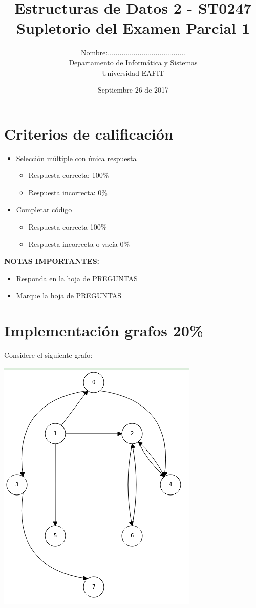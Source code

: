 \documentclass[twocolumn]{article}
\author{
Nombre:....................................... \\
    Departamento de Informática y Sistemas \\
    Universidad EAFIT \\
}
\title{
    Estructuras de Datos 2 - ST0247 \\
    Supletorio del Examen Parcial 1 
}
\date{
    Septiembre 26 de 2017
}
\begin{document}
\vspace{-5cm}
\maketitle


\section*{Criterios de calificación}

\begin{itemize}
\item Selección múltiple con única respuesta
\begin{itemize}
\item Respuesta correcta: 100\%
\item Respuesta incorrecta: 0\%
\end{itemize}

\item Completar código
\begin{itemize}
\item Respuesta correcta 100\%
\item Respuesta incorrecta o vacía 0\%
\end{itemize}
\end{itemize}

\vspace{1cm}

\textbf{NOTAS IMPORTANTES:}
\begin{itemize}
	\item Responda en la hoja de PREGUNTAS
	\item Marque la hoja de PREGUNTAS
\end{itemize}


\section{Implementación grafos 20\%}
Considere el siguiente grafo:

\begin{center}
\includegraphics[scale=0.5]{grafin.png}
\end{center}
\end{document}
